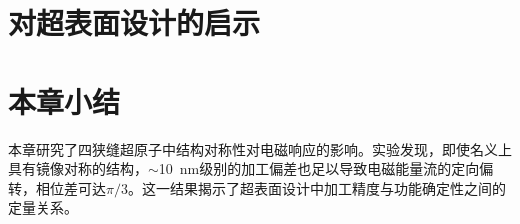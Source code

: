 \section{对超表面设计的启示}
\label{sec:r3-implication}


\section{本章小结}
\label{sec:r3-summary}

本章研究了四狭缝超原子中结构对称性对电磁响应的影响。实验发现，即使名义上具有镜像对称的结构，$\sim$\SI{10}{nm}级别的加工偏差也足以导致电磁能量流的定向偏转，相位差可达$\pi/3$。这一结果揭示了超表面设计中加工精度与功能确定性之间的定量关系。
